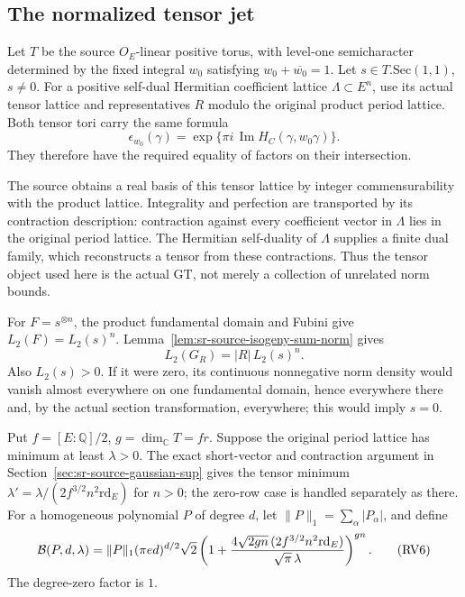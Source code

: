 \subsection{The normalized tensor jet}
Let \(T\) be the source \(O_E\)-linear positive torus, with
level-one semicharacter determined by the fixed integral \(w_0\)
satisfying \(w_0+\overline{w_0}=1\).
Let \(s\in T.\mathrm{Sec}(1,1)\), \(s\ne0\).
For a positive self-dual Hermitian coefficient lattice
\(\Lambda\subset E^n\), use its actual tensor lattice and
representatives \(R\) modulo the original product period lattice.
Both tensor tori carry the same formula
\[
 \epsilon_{w_0}(\gamma)
 =\exp\{\pi i\,\operatorname{Im}
                         H_C(\gamma,w_0\gamma)\}.
\]
They therefore have the required equality of factors on their
intersection.

The source obtains a real basis of this tensor lattice by
integer commensurability with the product lattice.
Integrality and perfection are transported by its contraction
description: contraction against every coefficient vector in
\(\Lambda\) lies in the original period lattice.
The Hermitian self-duality of \(\Lambda\) supplies a finite dual
family, which reconstructs a tensor from these contractions.
Thus the tensor object used here is the actual
\(\mathrm{GT}\), not merely a collection of unrelated norm bounds.

For \(F=s^{\otimes n}\), the product fundamental domain and
Fubini give \(L_2(F)=L_2(s)^n\).
Lemma~\ref{lem:sr-source-isogeny-sum-norm} gives
\[
                         L_2(G_R)=|R|\,L_2(s)^n .
 \tag{RV5}\label{eq:sr-source-tensor-sum-norm}
\]
Also \(L_2(s)>0\).
If it were zero, its continuous nonnegative norm density would
vanish almost everywhere on one fundamental domain, hence
everywhere there and, by the actual section transformation,
everywhere; this would imply \(s=0\).

Put \(f=[E:\mathbb Q]/2\), \(g=\dim_\mathbb C T=fr\).
Suppose the original period lattice has minimum at least
\(\lambda>0\).
The exact short-vector and contraction argument in
Section~\ref{sec:sr-source-gaussian-sup} gives the tensor
minimum
\(\lambda'=\lambda/(2f^{3/2}n^2\mathrm{rd}_E)\) for \(n>0\);
the zero-row case is handled separately as there.
For a homogeneous polynomial \(P\) of degree \(d\), let
\(\|P\|_1=\sum_\alpha|P_\alpha|\), and define
\[
 {\cal B}(P,d,\lambda)=
 \|P\|_1(\pi e d)^{d/2}\sqrt2
 \left(1+
 {4\sqrt{2gn}\,(2f^{3/2}n^2\mathrm{rd}_E)
                       \over\sqrt\pi\,\lambda}\right)^{gn}.
 \tag{RV6}\label{eq:sr-source-normalized-jet-bound}
\]
The degree-zero factor is \(1\).

